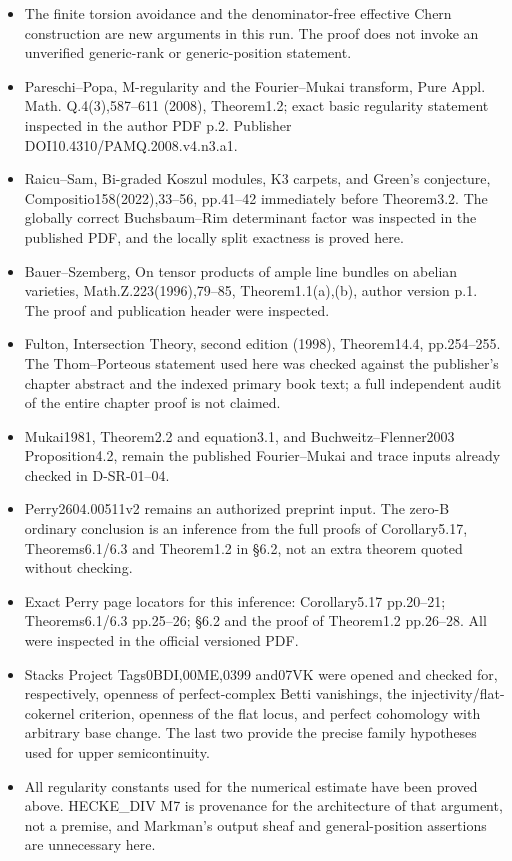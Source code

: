 \begin{itemize}
\item
  The finite torsion avoidance and the denominator-free effective Chern
  construction are new arguments in this run. The proof does not invoke
  an unverified generic-rank or generic-position statement.
\item
  Pareschi--Popa, M-regularity and the Fourier--Mukai transform, Pure
  Appl. Math. Q.4(3),587--611 (2008), Theorem1.2; exact basic regularity
  statement inspected in the author PDF p.2. Publisher
  DOI10.4310/PAMQ.2008.v4.n3.a1.
\item
  Raicu--Sam, Bi-graded Koszul modules, K3 carpets, and Green's
  conjecture, Compositio158(2022),33--56, pp.41--42 immediately before
  Theorem3.2. The globally correct Buchsbaum--Rim determinant factor was
  inspected in the published PDF, and the locally split exactness is
  proved here.
\item
  Bauer--Szemberg, On tensor products of ample line bundles on abelian
  varieties, Math.Z.223(1996),79--85, Theorem1.1(a),(b), author version
  p.1. The proof and publication header were inspected.
\item
  Fulton, Intersection Theory, second edition (1998), Theorem14.4,
  pp.254--255. The Thom--Porteous statement used here was checked
  against the publisher's chapter abstract and the indexed primary book
  text; a full independent audit of the entire chapter proof is not
  claimed.
\item
  Mukai1981, Theorem2.2 and equation3.1, and Buchweitz--Flenner2003
  Proposition4.2, remain the published Fourier--Mukai and trace inputs
  already checked in D-SR-01--04.
\item
  Perry2604.00511v2 remains an authorized preprint input. The zero-B
  ordinary conclusion is an inference from the full proofs of
  Corollary5.17, Theorems6.1/6.3 and Theorem1.2 in §6.2, not an extra
  theorem quoted without checking.
\item
  Exact Perry page locators for this inference: Corollary5.17 pp.20--21;
  Theorems6.1/6.3 pp.25--26; §6.2 and the proof of Theorem1.2 pp.26--28.
  All were inspected in the official versioned PDF.
\item
  Stacks Project Tags0BDI,00ME,0399 and07VK were opened and checked for,
  respectively, openness of perfect-complex Betti vanishings, the
  injectivity/flat-cokernel criterion, openness of the flat locus, and
  perfect cohomology with arbitrary base change. The last two provide
  the precise family hypotheses used for upper semicontinuity.
\item
  All regularity constants used for the numerical estimate have been
  proved above. HECKE\_DIV M7 is provenance for the architecture of that
  argument, not a premise, and Markman's output sheaf and
  general-position assertions are unnecessary here.
\end{itemize}
